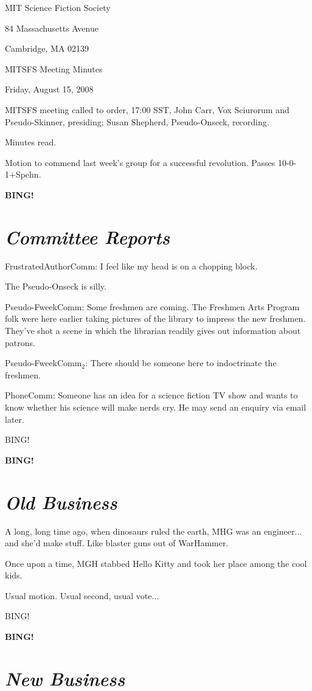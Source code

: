 \documentclass[10pt]{article}
\newcommand{\bing}{{\bf BING!} }
\newcommand{\goto}[1]{\bing \vskip 12pt \section*{{\em{#1}}}}
\begin{document}
\begin{center}

MIT Science Fiction Society

84 Massachusetts Avenue

Cambridge, MA 02139

\vspace{12pt}

MITSFS Meeting Minutes

Friday, August 15, 2008

\end{center}

\vspace{18pt}

\setlength{\parskip}{6pt}

\noindent
MITSFS meeting called to order, 17:00 SST,
John Carr, Vox Sciurorum and Pseudo-Skinner, presiding;
Susan Shepherd, Pseudo-Onseck, recording.

Minutes read.

Motion to commend last week's group for a successful revolution. Passes 10-0-1+Spehn.


\goto{Committee Reports}

FrustratedAuthorComm: I feel like my head is on a chopping block.

The Pseudo-Onseck is silly.

Pseudo-FweekComm: Some freshmen are coming. The Freshmen Arts Program folk were here earlier taking pictures of the library to impress the new freshmen. They've shot a scene in which the librarian readily gives out information about patrons.

Pseudo-FweekComm$_2$: There should be someone here to indoctrinate the freshmen. 

PhoneComm: Someone has an idea for a science fiction TV show and wants to know whether his science will make nerds cry. He may send an enquiry via email later.

BING!

\goto{Old Business}

A long, long time ago, when dinosaurs ruled the earth, MHG was an engineer... and she'd make stuff. Like blaster guns out of WarHammer.

Once upon a time, MGH stabbed Hello Kitty and took her place among the cool kids.

Usual motion. Usual second, usual vote...

BING!

\goto{New Business}
\end{document}
